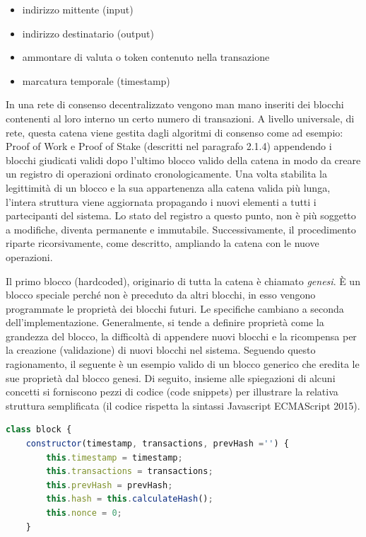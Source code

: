 \begin{itemize}
\item indirizzo mittente (input) 
\item indirizzo destinatario (output)
\item ammontare di valuta o token contenuto nella transazione
\item marcatura temporale (timestamp)
\end{itemize}


In una rete di consenso decentralizzato vengono man mano inseriti dei blocchi contenenti al loro interno un certo numero di transazioni. A livello universale, di rete, questa catena viene gestita dagli algoritmi di consenso come ad esempio: Proof of Work e Proof of Stake (descritti nel paragrafo 2.1.4) appendendo i blocchi giudicati validi dopo l'ultimo blocco valido della catena in modo da creare un registro di operazioni ordinato cronologicamente. Una volta stabilita la legittimità di un blocco e la sua appartenenza alla catena valida più lunga, l’intera struttura viene aggiornata propagando i nuovi elementi a tutti i partecipanti del sistema. Lo stato del registro a questo punto, non è più soggetto a modifiche, diventa permanente e immutabile. Successivamente, il procedimento riparte ricorsivamente, come descritto, ampliando la catena con le nuove operazioni.

Il primo blocco \smallskip {} (hardcoded), originario di tutta la catena è chiamato \emph{genesi}. È un blocco speciale perché non è preceduto da altri blocchi, in esso vengono programmate le proprietà dei blocchi futuri. Le specifiche cambiano a seconda dell’implementazione. Generalmente, si tende a definire proprietà come la grandezza del blocco, la difficoltà di appendere nuovi blocchi e la ricompensa per la creazione (validazione) di nuovi blocchi nel sistema. 
Seguendo questo ragionamento, il seguente è un esempio valido di un blocco generico che eredita le sue proprietà dal blocco genesi.
Di seguito, insieme alle spiegazioni di alcuni concetti si forniscono pezzi di codice (code snippets) per illustrare la relativa struttura semplificata (il codice rispetta la sintassi Javascript ECMAScript 2015). 
\\

\begin{lstlisting}[caption={Esempio di struttura di un blocco},language=JavaScript]
class block {
    constructor(timestamp, transactions, prevHash ='') {
        this.timestamp = timestamp;
        this.transactions = transactions;
        this.prevHash = prevHash;
        this.hash = this.calculateHash();
        this.nonce = 0;
    }
\end{lstlisting}

